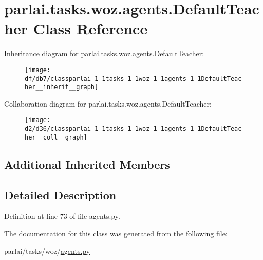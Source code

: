 \hypertarget{classparlai_1_1tasks_1_1woz_1_1agents_1_1DefaultTeacher}{}\section{parlai.\+tasks.\+woz.\+agents.\+Default\+Teacher Class Reference}
\label{classparlai_1_1tasks_1_1woz_1_1agents_1_1DefaultTeacher}


Inheritance diagram for parlai.\+tasks.\+woz.\+agents.\+Default\+Teacher\+:
\nopagebreak
\begin{figure}[H]
\begin{center}
\leavevmode
\texttt{[image: df/db7/classparlai\_1\_1tasks\_1\_1woz\_1\_1agents\_1\_1DefaultTeacher\_\_inherit\_\_graph]}
\end{center}
\end{figure}


Collaboration diagram for parlai.\+tasks.\+woz.\+agents.\+Default\+Teacher\+:
\nopagebreak
\begin{figure}[H]
\begin{center}
\leavevmode
\texttt{[image: d2/d36/classparlai\_1\_1tasks\_1\_1woz\_1\_1agents\_1\_1DefaultTeacher\_\_coll\_\_graph]}
\end{center}
\end{figure}
\subsection*{Additional Inherited Members}


\subsection{Detailed Description}


Definition at line 73 of file agents.\+py.



The documentation for this class was generated from the following file\+:\begin{DoxyCompactItemize}
\item 
parlai/tasks/woz/\hyperlink{parlai_2tasks_2woz_2agents_8py}{agents.\+py}\end{DoxyCompactItemize}
